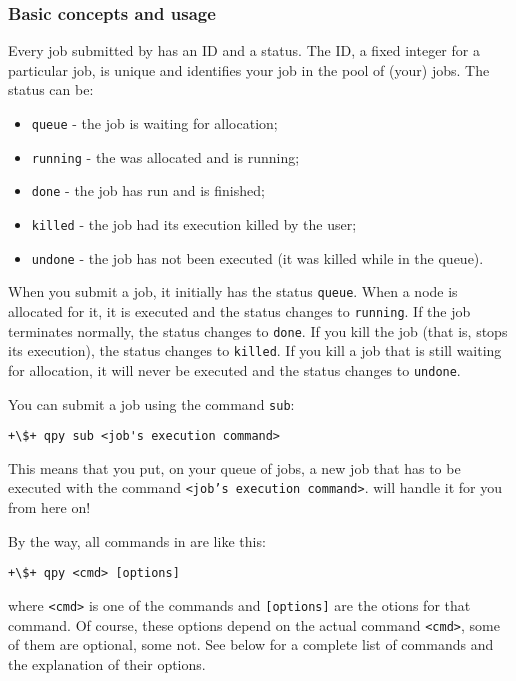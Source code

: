 \documentclass[a4paper,12pt]{article}
\begin{document}
\subsubsection{Basic concepts and usage}

Every job submitted by \qpy{} has an ID and a status.
The ID, a fixed integer for a particular job, is unique and identifies your job in the pool of (your) jobs.
The status can be:

\begin{itemize}
\item \texttt{queue}   - the job is waiting for allocation;
\item \texttt{running} - the was allocated and is running;
\item \texttt{done}    - the job has run and is finished;
\item \texttt{killed}  - the job had its execution killed by the user;
\item \texttt{undone}  - the job has not been executed (it was killed while in the queue).
\end{itemize}

When you submit a job, it initially has the  status \texttt{queue}.
When a node is allocated for it, it is executed and the status changes to \texttt{running}.
If the job terminates normally, the status changes to \texttt{done}.
If you kill the job (that is, stops its execution), the status changes to \texttt{killed}.
If you kill a job that is still waiting for allocation, it will never be executed and the status changes to \texttt{undone}.

You can submit a job using the command \texttt{sub}:
\begin{lstlisting}[style=BashStyle]
+\$+ qpy sub <job's execution command>
\end{lstlisting}
This means that you put, on your queue of jobs, a new job that has to be executed with the command \texttt{<job's execution command>}.
\qpy{} will handle it for you from here on!

By the way, all commands in \qpy{} are like this:
\begin{lstlisting}[style=BashStyle]
+\$+ qpy <cmd> [options]
\end{lstlisting}
where \texttt{<cmd>} is one of the \qpy{} commands and \texttt{[options]} are the otions for that command.
Of course, these options depend on the actual command \texttt{<cmd>}, some of them are optional, some not.
See below for a complete list of commands and the explanation of their options.
\end{document}
